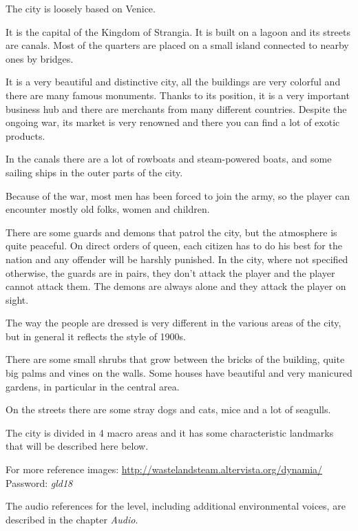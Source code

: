 The city is loosely based on Venice.

It is the capital of the Kingdom of Strangia. It is built on a lagoon and its streets are canals. Most of the quarters are placed on a small island connected to nearby ones by bridges.

It is a very beautiful and distinctive city, all the buildings are very colorful and there are many famous monuments. Thanks to its position, it is a very important business hub and there are merchants from many different countries. Despite the ongoing war, its market is very renowned and there you can find a lot of exotic products.

In the canals there are a lot of rowboats and steam-powered boats, and some sailing ships in the outer parts of the city.

Because of the war, most men has been forced to join the army, so the player can encounter mostly old folks, women and children.

There are some guards and demons that patrol the city, but the atmosphere is quite peaceful. On direct orders of queen, each citizen has to do his best for the nation and any offender will be harshly punished. In the city, where not specified otherwise, the guards are in pairs, they don't attack the player and the player cannot attack them. The demons are always alone and they attack the player on sight.

The way the people are dressed is very different in the various areas of the city, but in general it reflects the style of 1900s.

There are some small shrubs that grow between the bricks of the building, quite big palms and vines on the walls. Some houses have beautiful and very manicured gardens, in particular in the central area.

On the streets there are some stray dogs and cats, mice and a lot of seagulls.

The city is divided in 4 macro areas and it has some characteristic landmarks that will be described here below.

For more reference images: \url{http://wastelandsteam.altervista.org/dynamia/}\\
Password: \textit{gld18}

The audio references for the level, including additional environmental voices, are described in the chapter \textit{Audio}.
